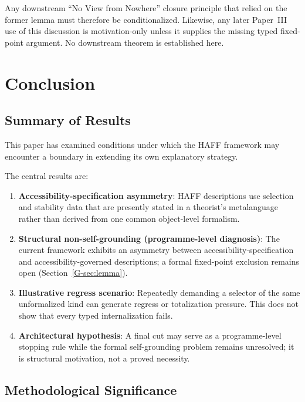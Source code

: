 \documentclass[12pt,a4paper,openany]{book}
\begin{document}
Any downstream ``No View from Nowhere'' closure principle that relied on the former lemma must therefore be conditionalized.  Likewise, any later Paper~III use of this discussion is motivation-only unless it supplies the missing typed fixed-point argument.  No downstream theorem is established here.

\section{Conclusion}
\label{G-sec:conclusion}

\subsection{Summary of Results}

This paper has examined conditions under which the HAFF framework may encounter a boundary in extending its own explanatory strategy.

The central results are:

\begin{enumerate}
    \item \textbf{Accessibility-specification asymmetry}: HAFF descriptions use selection and stability data that are presently stated in a theorist's metalanguage rather than derived from one common object-level formalism.
    
    \item \textbf{Structural non-self-grounding (programme-level diagnosis)}: The current framework exhibits an asymmetry between accessibility-specification and accessibility-governed descriptions; a formal fixed-point exclusion remains open (Section~\ref{G-sec:lemma}).
    
    \item \textbf{Illustrative regress scenario}: Repeatedly demanding a selector of the same unformalized kind can generate regress or totalization pressure. This does not show that every typed internalization fails.
    
    \item \textbf{Architectural hypothesis}: A final cut may serve as a programme-level stopping rule while the formal self-grounding problem remains unresolved; it is structural motivation, not a proved necessity.
\end{enumerate}

\subsection{Methodological Significance}
\end{document}
